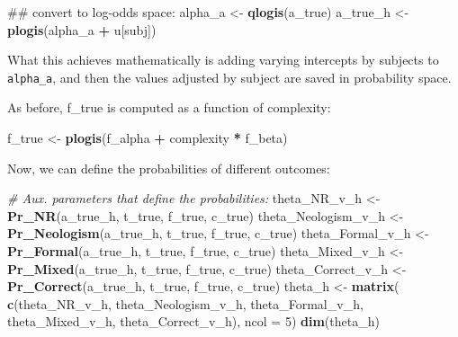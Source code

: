 \documentclass[12pt,]{krantz}
\newenvironment{Shaded}{\begin{snugshade}}{\end{snugshade}}
\newcommand{\KeywordTok}[1]{\textcolor[rgb]{0.13,0.29,0.53}{\textbf{#1}}}
\newcommand{\DataTypeTok}[1]{\textcolor[rgb]{0.13,0.29,0.53}{#1}}
\newcommand{\DecValTok}[1]{\textcolor[rgb]{0.00,0.00,0.81}{#1}}
\newcommand{\StringTok}[1]{\textcolor[rgb]{0.31,0.60,0.02}{#1}}
\newcommand{\CommentTok}[1]{\textcolor[rgb]{0.56,0.35,0.01}{\textit{#1}}}
\newcommand{\OperatorTok}[1]{\textcolor[rgb]{0.81,0.36,0.00}{\textbf{#1}}}
\newcommand{\NormalTok}[1]{#1}
\theoremstyle{definition}
\theoremstyle{definition}
\theoremstyle{definition}
\theoremstyle{remark}
\begin{document}
\begin{Shaded}
\begin{Highlighting}[]
\NormalTok{## convert to log-odds space:}
\NormalTok{alpha_a <-}\StringTok{ }\KeywordTok{qlogis}\NormalTok{(a_true)}
\NormalTok{a_true_h <-}\StringTok{ }\KeywordTok{plogis}\NormalTok{(alpha_a }\OperatorTok{+}\StringTok{ }\NormalTok{u[subj])}
\end{Highlighting}
\end{Shaded}

What this achieves mathematically is adding varying intercepts by
subjects to \texttt{alpha\_a}, and then the values adjusted by subject
are saved in probability space.

As before, f\_true is computed as a function of complexity:

\begin{Shaded}
\begin{Highlighting}[]
\NormalTok{f_true <-}\StringTok{ }\KeywordTok{plogis}\NormalTok{(f_alpha }\OperatorTok{+}\StringTok{ }\NormalTok{complexity }\OperatorTok{*}\StringTok{ }\NormalTok{f_beta)}
\end{Highlighting}
\end{Shaded}

Now, we can define the probabilities of different outcomes:

\begin{Shaded}
\begin{Highlighting}[]
\CommentTok{# Aux. parameters that define the probabilities:}
\NormalTok{theta_NR_v_h <-}\StringTok{ }\KeywordTok{Pr_NR}\NormalTok{(a_true_h, t_true, f_true, c_true) }
\NormalTok{theta_Neologism_v_h <-}\StringTok{ }\KeywordTok{Pr_Neologism}\NormalTok{(a_true_h, t_true, f_true, c_true)}
\NormalTok{theta_Formal_v_h <-}\StringTok{ }\KeywordTok{Pr_Formal}\NormalTok{(a_true_h, t_true, f_true, c_true)}
\NormalTok{theta_Mixed_v_h <-}\StringTok{ }\KeywordTok{Pr_Mixed}\NormalTok{(a_true_h, t_true, f_true, c_true)}
\NormalTok{theta_Correct_v_h <-}\StringTok{ }\KeywordTok{Pr_Correct}\NormalTok{(a_true_h, t_true, f_true, c_true)}
\NormalTok{theta_h <-}\StringTok{ }\KeywordTok{matrix}\NormalTok{(}
  \KeywordTok{c}\NormalTok{(theta_NR_v_h,}
\NormalTok{    theta_Neologism_v_h,}
\NormalTok{    theta_Formal_v_h,}
\NormalTok{    theta_Mixed_v_h,}
\NormalTok{    theta_Correct_v_h),}
  \DataTypeTok{ncol =} \DecValTok{5}\NormalTok{)}
\KeywordTok{dim}\NormalTok{(theta_h)}
\end{Highlighting}
\end{Shaded}
\end{document}
